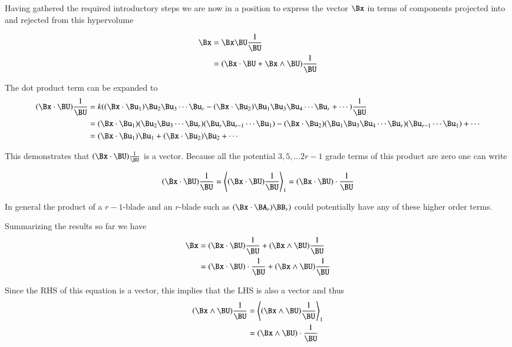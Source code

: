 \documentclass{article}
\begin{document}
Having gathered the required introductory steps we are now in a position to express the vector $\Bx$ in terms
of components projected into and rejected from this hypervolume

\begin{align*}
\Bx &= \Bx \BU \frac{1}{\BU} \\
    &= (\Bx \cdot \BU + \Bx \wedge \BU)\frac{1}{\BU} \\
\end{align*}

The dot product term can be expanded to
\begin{align*}
(\Bx \cdot \BU) \frac{1}{\BU} 
&= k(
      (\Bx \cdot \Bu_1)\Bu_2\Bu_3\cdots\Bu_r
    - (\Bx \cdot \Bu_2)\Bu_1\Bu_3\Bu_4\cdots\Bu_r
    + \cdots
    ) \frac{1}{\BU} \\
&= 
  (\Bx \cdot \Bu_1)(\Bu_2\Bu_3\cdots\Bu_r)(\Bu_r\Bu_{r-1}\cdots\Bu_1)
- (\Bx \cdot \Bu_2)(\Bu_1\Bu_3\Bu_4\cdots\Bu_r)(\Bu_{r-1}\cdots\Bu_1)
+ \cdots \\
&= 
  (\Bx \cdot \Bu_1)\Bu_1
+ (\Bx \cdot \Bu_2)\Bu_2
+ \cdots \\
\end{align*}

This demonstrates that $(\Bx \cdot \BU) \frac{1}{\BU}$ is a vector.  Because all the potential $3, 5, ... 2r-1$ grade terms of this product are zero one can write

\[
(\Bx \cdot \BU) \frac{1}{\BU} = \left<(\Bx \cdot \BU) \frac{1}{\BU}\right>_1 = (\Bx \cdot \BU) \cdot \frac{1}{\BU}
\]

In general the product of a $r-1$-blade and an $r$-blade such as $(\Bx \cdot \BA_r)\BB_r)$ could potentially have any of these higher order terms.

Summarizing the results so far we have
\begin{align*}
\Bx
&= (\Bx \cdot \BU)\frac{1}{\BU} + (\Bx \wedge \BU)\frac{1}{\BU} \\
&= (\Bx \cdot \BU) \cdot \frac{1}{\BU} + (\Bx \wedge \BU)\frac{1}{\BU} \\
\end{align*}

Since the RHS of this equation is a vector, this implies that the LHS is also a vector and thus
\begin{align*}
(\Bx \wedge \BU)\frac{1}{\BU} 
&= \left<(\Bx \wedge \BU)\frac{1}{\BU}\right>_1 \\
&= (\Bx \wedge \BU) \cdot \frac{1}{\BU} \\
\end{align*}
\end{document}
